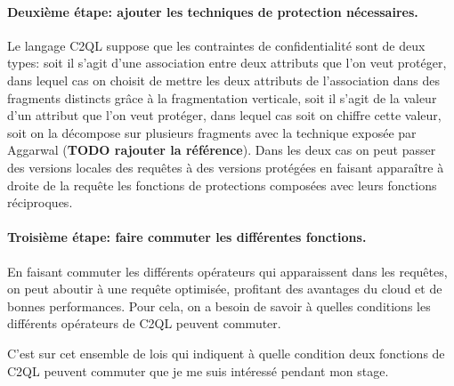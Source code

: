 \paragraph{Deuxième étape: ajouter les techniques de protection nécessaires.}
Le langage C2QL suppose que les contraintes de confidentialité sont de deux types:
soit il s'agit d'une association entre deux attributs que l'on veut 
protéger, dans lequel cas on choisit de mettre les deux attributs de l'association
dans des fragments distincts grâce à la fragmentation verticale, soit il s'agit de la
valeur d'un attribut que l'on veut protéger, dans lequel cas soit on chiffre cette valeur,
soit on la décompose sur plusieurs fragments avec la technique exposée par Aggarwal 
(\textbf{TODO rajouter la référence}). Dans les deux cas on peut passer des 
versions locales des requêtes à des versions protégées en faisant apparaître 
à droite de la requête les fonctions de protections composées avec leurs fonctions réciproques.

\paragraph{Troisième étape: faire commuter les différentes fonctions.}
En faisant commuter les différents opérateurs qui apparaissent dans les requêtes,
on peut aboutir à une requête optimisée, profitant des avantages du cloud et de bonnes performances.
Pour cela, on a besoin de savoir à quelles conditions les différents opérateurs de C2QL peuvent
commuter.

C'est sur cet ensemble de lois qui indiquent à quelle condition deux fonctions de C2QL peuvent
commuter que je me suis intéressé pendant mon stage.